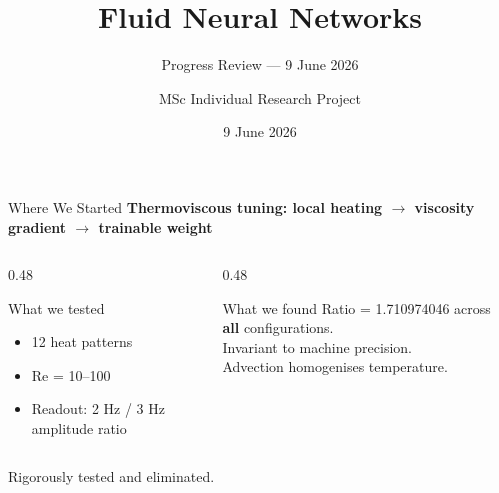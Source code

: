 \documentclass[aspectratio=169,11pt]{beamer}
\title{Fluid Neural Networks}
\subtitle{Progress Review — 9 June 2026}
\author{MSc Individual Research Project}
\institute{Cranfield University\hspace{0.3cm}|\hspace{0.3cm}Supervisors: Prof. Weisi Guo, Prof. Takis Tsoutsanis}
\date{9 June 2026}
\begin{document}
\begin{frame}[plain]
  \titlepage
\end{frame}

\begin{frame}{Where We Started}
  \textbf{Thermoviscous tuning: local heating $\rightarrow$ viscosity gradient $\rightarrow$ trainable weight}

  \vspace{0.5cm}
  \begin{columns}[T]
    \begin{column}{0.48\textwidth}
      \begin{block}{\footnotesize What we tested}
        \footnotesize
        \begin{itemize}
          \item 12 heat patterns
          \item Re = 10--100
          \item Readout: 2 Hz / 3 Hz amplitude ratio
        \end{itemize}
      \end{block}
    \end{column}
    \begin{column}{0.48\textwidth}
      \begin{alertblock}{\footnotesize What we found}
        \footnotesize
        Ratio = 1.710974046 across \textbf{all} configurations.\\
        Invariant to machine precision.\\
        Advection homogenises temperature.
      \end{alertblock}
    \end{column}
  \end{columns}

  \vspace{0.5cm}
  \begin{center}
    \textcolor{gdpBurgundy}{\large Rigorously tested and eliminated.}
  \end{center}
\end{frame}
\end{document}
